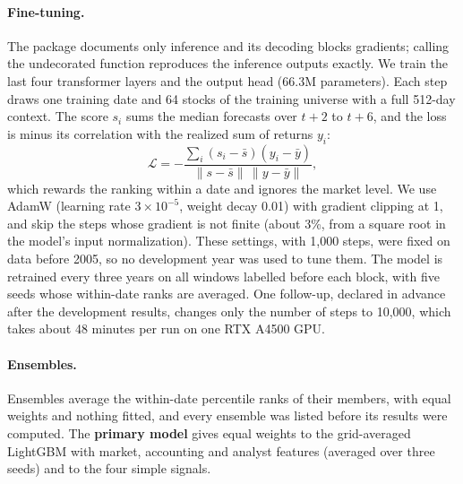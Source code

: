 \paragraph{Fine-tuning.}
The package documents only inference and its decoding blocks gradients; calling the undecorated function reproduces the inference outputs exactly.
We train the last four transformer layers and the output head (66.3M parameters).
Each step draws one training date and 64 stocks of the training universe with a full 512-day context.
The score $s_i$ sums the median forecasts over $t{+}2$ to $t{+}6$, and the loss is minus its correlation with the realized sum of returns $y_i$:
\begin{equation}
\mathcal{L} = -\frac{\sum_i (s_i-\bar s)(y_i-\bar y)}{\lVert s-\bar s\rVert\,\lVert y-\bar y\rVert},
\label{eq:loss}
\end{equation}
which rewards the ranking within a date and ignores the market level.
We use AdamW (learning rate $3\times10^{-5}$, weight decay 0.01) with gradient clipping at 1, and skip the steps whose gradient is not finite (about 3\%, from a square root in the model's input normalization).
These settings, with 1,000 steps, were fixed on data before 2005, so no development year was used to tune them.
The model is retrained every three years on all windows labelled before each block, with five seeds whose within-date ranks are averaged.
One follow-up, declared in advance after the development results, changes only the number of steps to 10,000, which takes about 48 minutes per run on one RTX A4500 GPU.

\paragraph{Ensembles.}
Ensembles average the within-date percentile ranks of their members, with equal weights and nothing fitted, and every ensemble was listed before its results were computed.
The \textbf{primary model} gives equal weights to the grid-averaged LightGBM with market, accounting and analyst features (averaged over three seeds) and to the four simple signals.
